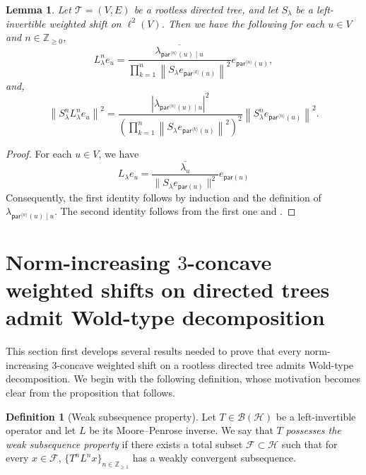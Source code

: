 \documentclass[11pt, reqno, a4paper]{amsart}
\newtheorem{lemma}[theorem]{Lemma}
\theoremstyle{definition}
\newtheorem{definition}[theorem]{Definition}
\newcommand{\calF}{{\mathcal{F}}}
\newcommand{\calH}{{\mathcal{H}}}
\newcommand{\scrT}{{\mathscr T}}
\renewcommand{\ge}{\geqslant}
\newcommand{\Z}{\mathbb Z}
\newcommand{\pr}{\mathsf{par}}
\numberwithin{equation}{section}
\begin{document}
\begin{lemma}
    Let $\scrT = ( V,  E)$ be a rootless directed tree, and let $S_{\lambda}$ be a left-invertible weighted shift on $\ell ^2 ( V)$. Then we have the following for each $u\in  V$ and $n \in \Z_{\ge 0}$,
    \begin{equation*}
        L_{\lambda}^n e_u = \frac{ \overline{\lambda_{\pr^{\langle n\rangle}(u)\mid u}} }{ \prod_{k=1}^n \left\lVert S_\lambda e_{\pr^{\langle k\rangle}(u)} \right\rVert^2 } e_{\pr^{\langle n\rangle}(u)},
    \end{equation*}
    and,
    \begin{equation*}
        \left\lVert S_\lambda^n L_{\lambda}^n e_u \right\rVert ^2 = \frac{ \left|\lambda_{\pr^{\langle n\rangle}(u)\mid u}\right|^2}{ \left( \prod_{k=1}^n \left\lVert S_\lambda e_{\pr^{\langle k\rangle}(u)} \right\rVert^2 \right)^2 } \left\lVert S_\lambda^n e_{\pr^{\langle n\rangle}(u)} \right\rVert^2.
    \end{equation*}
    \label{lem:all-about-L-lambda}
\end{lemma}

\begin{proof}
For each $u \in V$, we have
\begin{equation*}
    L_\lambda e_u = \frac{\overline{\lambda_u}} {\|S_\lambda e_{\pr(u)}\|^2} e_{\pr(u)}
\end{equation*}
Consequently, the first identity follows by induction and the definition of
$\lambda_{\pr^{\langle n\rangle}(u)\mid u}$. The second identity follows from the first one and .
\end{proof}

\section{Norm-increasing \texorpdfstring{$3$}{3}-concave weighted shifts on directed trees admit Wold-type decomposition}\label{sec:positive-theorem}

This section first develops several results needed to prove that every norm-increasing $3$-concave weighted shift on a rootless directed tree admits Wold-type decomposition. We begin with the following definition, whose motivation becomes clear from the proposition that follows.

\begin{definition}[Weak subsequence property]
    Let $T\in\mathcal B(\mathcal H)$ be a left-invertible operator and let $L$ be its Moore--Penrose inverse. We say that $T$ \textit{possesses the weak subsequence property} if there exists a total subset $\calF \subset \calH$ such that for every $x \in \calF$, $\{ T^n L^n x\}_{n \in \Z_{\ge 1}}$ has a weakly convergent subsequence.
\end{definition}
\end{document}
